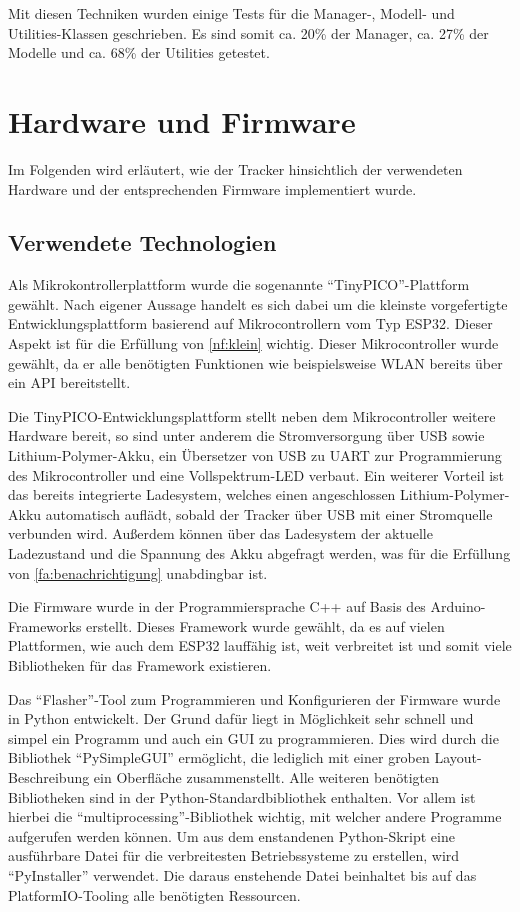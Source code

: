 Mit diesen Techniken wurden einige Tests für die Manager-, Modell- und Utilities-Klassen geschrieben.
Es sind somit ca. 20\% der Manager, ca. 27\% der Modelle und ca. 68\% der Utilities getestet. 

\section{Hardware und Firmware}

Im Folgenden wird erläutert, wie der Tracker hinsichtlich der verwendeten Hardware und der
entsprechenden Firmware implementiert wurde.

\subsection{Verwendete Technologien}

Als Mikrokontrollerplattform wurde die sogenannte \enquote{TinyPICO}-Plattform gewählt. Nach eigener
Aussage handelt es sich dabei um die kleinste vorgefertigte Entwicklungsplattform basierend auf
Mikrocontrollern vom Typ ESP32. Dieser Aspekt ist für die Erfüllung von \ref{nf:klein} wichtig.
Dieser Mikrocontroller wurde gewählt, da er alle benötigten Funktionen wie beispielsweise \gls{WLAN}
bereits über ein \gls{API} bereitstellt.

Die TinyPICO-Entwicklungsplattform stellt neben dem Mikrocontroller weitere Hardware bereit, so sind
unter anderem
die Stromversorgung über \gls{USB} sowie Lithium-Polymer-\gls{Akku}, ein Übersetzer von \gls{USB}
zu \gls{UART} zur Programmierung des Mikrocontroller und eine Vollspektrum-\gls{LED} verbaut.
Ein weiterer Vorteil ist das bereits integrierte Ladesystem, welches einen angeschlossen
Lithium-Polymer-\gls{Akku} automatisch auflädt, sobald der Tracker über \gls{USB} mit einer
Stromquelle verbunden wird. Außerdem können über das Ladesystem der aktuelle Ladezustand und die
Spannung des \gls{Akku} abgefragt werden, was für die Erfüllung von \ref{fa:benachrichtigung}
unabdingbar ist.

Die Firmware wurde in der Programmiersprache C++ auf Basis des Arduino-Frameworks erstellt. Dieses
Framework wurde gewählt, da es auf vielen Plattformen, wie auch dem ESP32 lauffähig ist, weit
verbreitet ist und somit viele Bibliotheken für das Framework existieren.

Das \enquote{Flasher}-Tool zum Programmieren und Konfigurieren der Firmware wurde in Python
entwickelt.
Der Grund dafür liegt in Möglichkeit sehr schnell und simpel ein Programm und auch ein \gls{GUI} zu
programmieren.
Dies wird durch die Bibliothek \enquote{PySimpleGUI} ermöglicht, die lediglich mit einer groben Layout-Beschreibung
ein Oberfläche zusammenstellt.
Alle weiteren benötigten Bibliotheken sind in der Python-Standardbibliothek enthalten.
Vor allem ist hierbei die \enquote{multiprocessing}-Bibliothek wichtig, mit welcher andere Programme aufgerufen werden können.
Um aus dem enstandenen Python-Skript eine ausführbare Datei für die verbreitesten Betriebssysteme zu erstellen, wird \enquote{PyInstaller} verwendet.
Die daraus enstehende Datei beinhaltet bis auf das PlatformIO-Tooling alle benötigten Ressourcen. 

